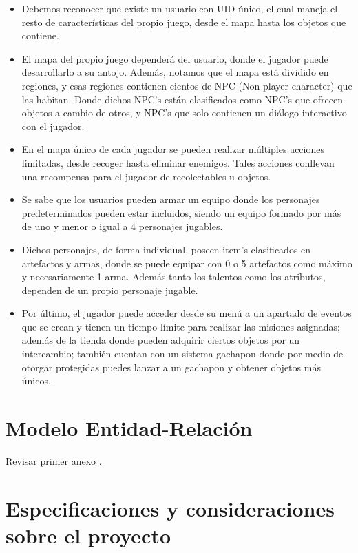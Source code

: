 \documentclass{report}
\begin{document}
\begin{itemize}
    \item Debemos reconocer que existe un usuario con UID único, el cual maneja el resto de características del propio juego, desde el mapa hasta los objetos que contiene.
    \item El mapa del propio juego dependerá del usuario, donde el jugador puede desarrollarlo a su antojo. Además, notamos que el mapa está dividido en regiones, y esas regiones contienen cientos de NPC (Non-player character) que las habitan. Donde dichos NPC’s están clasificados como NPC’s que ofrecen objetos a cambio de otros, y NPC’s que solo contienen un diálogo interactivo con el jugador.
    \item En el mapa único de cada jugador se pueden realizar múltiples acciones limitadas, desde recoger hasta eliminar enemigos. Tales acciones conllevan una recompensa para el jugador de recolectables u objetos.
    \item Se sabe que los usuarios pueden armar un equipo donde los personajes predeterminados pueden estar incluidos, siendo un equipo formado por más de uno y menor o igual a 4 personajes jugables.
    \item Dichos personajes, de forma individual, poseen item’s clasificados en artefactos y armas, donde se puede equipar con 0 o 5 artefactos como máximo y necesariamente 1 arma. Además tanto los talentos como los atributos, dependen de un propio personaje jugable.
    \item Por último, el jugador puede acceder desde su menú a un apartado de eventos que se crean y tienen un tiempo límite para realizar las misiones asignadas; además de la tienda donde pueden adquirir ciertos objetos por un intercambio; también cuentan con un sistema gachapon donde por medio de otorgar protegidas puedes lanzar a un gachapon y obtener objetos más únicos.
\end{itemize}

\section{Modelo Entidad-Relación}
Revisar primer anexo \pageref{Entidad_Relacion}.

\section{Especificaciones y consideraciones sobre el proyecto}
\end{document}
